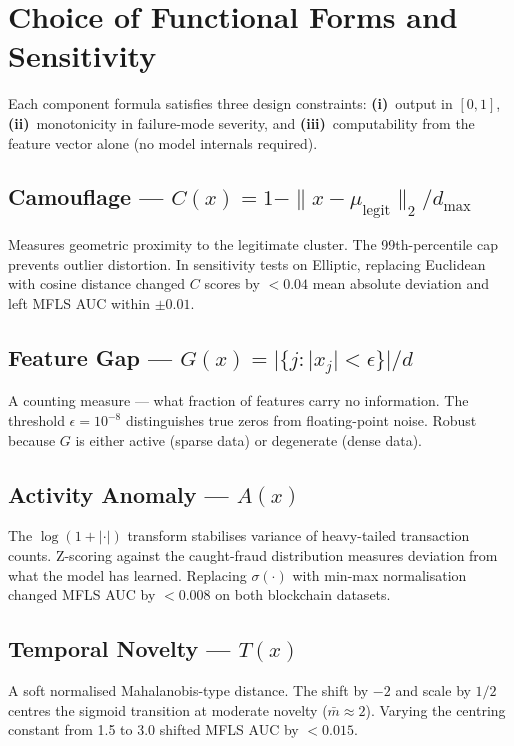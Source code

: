 \documentclass[journal]{IEEEtran}
\begin{document}
\section{Choice of Functional Forms and Sensitivity}
\label{app:sensitivity}

Each component formula satisfies three design constraints: \textbf{(i)}~output in $[0,1]$, \textbf{(ii)}~monotonicity in failure-mode severity, and \textbf{(iii)}~computability from the feature vector alone (no model internals required).

\subsection{Camouflage --- $C(x) = 1 - \|x - \mu_{\text{legit}}\|_2 / d_{\max}$}

Measures geometric proximity to the legitimate cluster. The 99th-percentile cap prevents outlier distortion. In sensitivity tests on Elliptic, replacing Euclidean with cosine distance changed $C$ scores by $<0.04$ mean absolute deviation and left MFLS AUC within $\pm 0.01$.

\subsection{Feature Gap --- $G(x) = |\{j : |x_j| < \epsilon\}| / d$}

A counting measure --- what fraction of features carry no information. The threshold $\epsilon = 10^{-8}$ distinguishes true zeros from floating-point noise. Robust because $G$ is either active (sparse data) or degenerate (dense data).

\subsection{Activity Anomaly --- $A(x)$}

The $\log(1+|\cdot|)$ transform stabilises variance of heavy-tailed transaction counts. Z-scoring against the caught-fraud distribution measures deviation from what the model has learned. Replacing $\sigma(\cdot)$ with min-max normalisation changed MFLS AUC by $<0.008$ on both blockchain datasets.

\subsection{Temporal Novelty --- $T(x)$}

A soft normalised Mahalanobis-type distance. The shift by $-2$ and scale by $1/2$ centres the sigmoid transition at moderate novelty ($\bar{m} \approx 2$). Varying the centring constant from 1.5 to 3.0 shifted MFLS AUC by $<0.015$.
\end{document}
